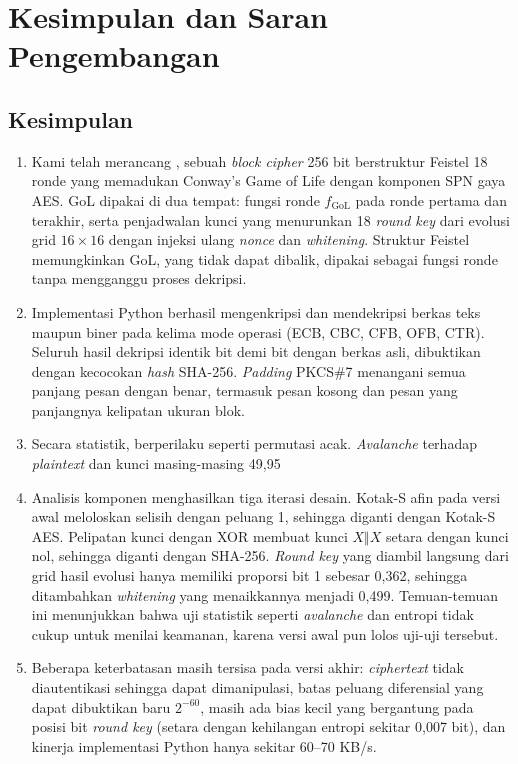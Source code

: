 \chapter{Kesimpulan dan Saran Pengembangan}
\label{ch:kesimpulan}

\section{Kesimpulan}
\begin{enumerate}
    \item Kami telah merancang \algname, sebuah \textit{block cipher} 256 bit berstruktur Feistel 18 ronde yang memadukan Conway's Game of Life dengan komponen SPN gaya AES. GoL dipakai di dua tempat: fungsi ronde $f_{\text{GoL}}$ pada ronde pertama dan terakhir, serta penjadwalan kunci yang menurunkan 18 \textit{round key} dari evolusi grid $16 \times 16$ dengan injeksi ulang \textit{nonce} dan \textit{whitening}. Struktur Feistel memungkinkan GoL, yang tidak dapat dibalik, dipakai sebagai fungsi ronde tanpa mengganggu proses dekripsi.
    \item Implementasi Python berhasil mengenkripsi dan mendekripsi berkas teks maupun biner pada kelima mode operasi (ECB, CBC, CFB, OFB, CTR). Seluruh hasil dekripsi identik bit demi bit dengan berkas asli, dibuktikan dengan kecocokan \textit{hash} SHA-256. \textit{Padding} PKCS\#7 menangani semua panjang pesan dengan benar, termasuk pesan kosong dan pesan yang panjangnya kelipatan ukuran blok.
    \item Secara statistik, \algname{} berperilaku seperti permutasi acak. \textit{Avalanche} terhadap \textit{plaintext} dan kunci masing-masing 49,95%
    \item Analisis komponen menghasilkan tiga iterasi desain. Kotak-S afin pada versi awal meloloskan selisih  dengan peluang 1, sehingga diganti dengan Kotak-S AES. Pelipatan kunci dengan XOR membuat kunci $X \Vert X$ setara dengan kunci nol, sehingga diganti dengan SHA-256. \textit{Round key} yang diambil langsung dari grid hasil evolusi hanya memiliki proporsi bit 1 sebesar 0,362, sehingga ditambahkan \textit{whitening} yang menaikkannya menjadi 0,499. Temuan-temuan ini menunjukkan bahwa uji statistik seperti \textit{avalanche} dan entropi tidak cukup untuk menilai keamanan, karena versi awal pun lolos uji-uji tersebut.
    \item Beberapa keterbatasan masih tersisa pada versi akhir: \textit{ciphertext} tidak diautentikasi sehingga dapat dimanipulasi, batas peluang diferensial yang dapat dibuktikan baru $2^{-60}$, masih ada bias kecil yang bergantung pada posisi bit \textit{round key} (setara dengan kehilangan entropi sekitar 0,007 bit), dan kinerja implementasi Python hanya sekitar 60--70 KB/s.
\end{enumerate}

